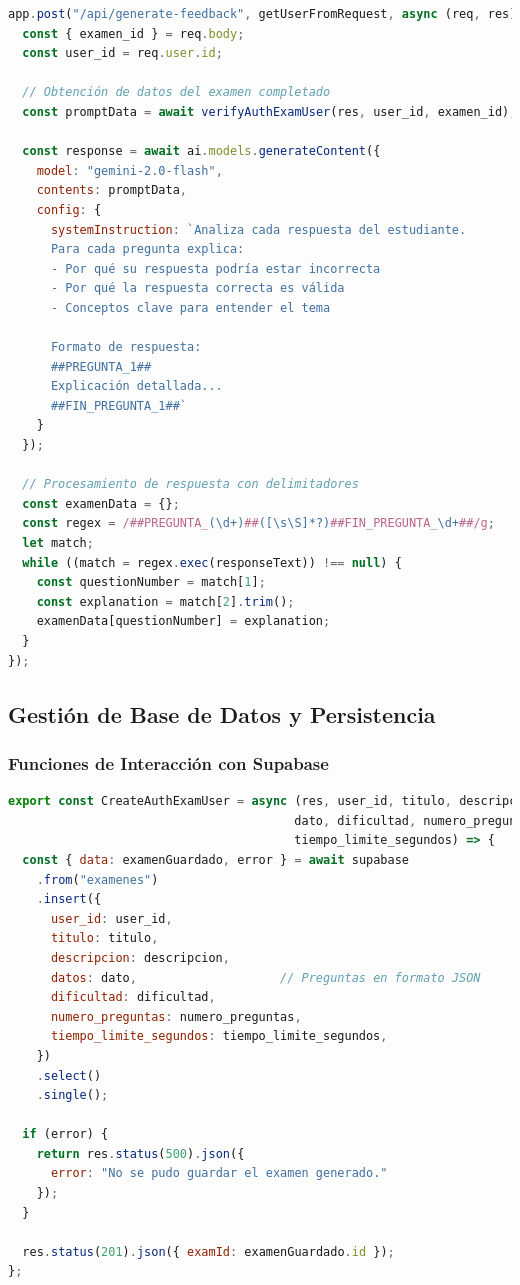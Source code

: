 \documentclass[12pt,a4paper]{report}
\begin{document}
\begin{lstlisting}[language=JavaScript, caption=API de retroalimentación personalizada]
app.post("/api/generate-feedback", getUserFromRequest, async (req, res) => {
  const { examen_id } = req.body;
  const user_id = req.user.id;

  // Obtención de datos del examen completado
  const promptData = await verifyAuthExamUser(res, user_id, examen_id);
  
  const response = await ai.models.generateContent({
    model: "gemini-2.0-flash",
    contents: promptData,
    config: {
      systemInstruction: `Analiza cada respuesta del estudiante.
      Para cada pregunta explica:
      - Por qué su respuesta podría estar incorrecta
      - Por qué la respuesta correcta es válida
      - Conceptos clave para entender el tema
      
      Formato de respuesta:
      ##PREGUNTA_1##
      Explicación detallada...
      ##FIN_PREGUNTA_1##`
    }
  });

  // Procesamiento de respuesta con delimitadores
  const examenData = {};
  const regex = /##PREGUNTA_(\d+)##([\s\S]*?)##FIN_PREGUNTA_\d+##/g;
  let match;
  while ((match = regex.exec(responseText)) !== null) {
    const questionNumber = match[1];
    const explanation = match[2].trim();
    examenData[questionNumber] = explanation;
  }
});
\end{lstlisting}

\subsection{Gestión de Base de Datos y Persistencia}

\subsubsection{Funciones de Interacción con Supabase}

\begin{lstlisting}[language=JavaScript, caption=Función de creación de exámenes - reqSupabase.js]
export const CreateAuthExamUser = async (res, user_id, titulo, descripcion, 
                                        dato, dificultad, numero_preguntas, 
                                        tiempo_limite_segundos) => {
  const { data: examenGuardado, error } = await supabase
    .from("examenes")
    .insert({
      user_id: user_id,
      titulo: titulo,
      descripcion: descripcion,
      datos: dato,                    // Preguntas en formato JSON
      dificultad: dificultad,
      numero_preguntas: numero_preguntas,
      tiempo_limite_segundos: tiempo_limite_segundos,
    })
    .select()
    .single();

  if (error) {
    return res.status(500).json({ 
      error: "No se pudo guardar el examen generado." 
    });
  }

  res.status(201).json({ examId: examenGuardado.id });
};
\end{lstlisting}
\end{document}

